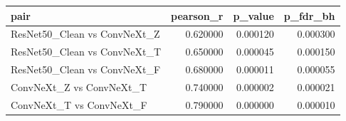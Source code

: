 \begin{tabular}{lrrr}
\toprule
pair & pearson_r & p_value & p_fdr_bh \\
\midrule
ResNet50_Clean vs ConvNeXt_Z & 0.620000 & 0.000120 & 0.000300 \\
ResNet50_Clean vs ConvNeXt_T & 0.650000 & 0.000045 & 0.000150 \\
ResNet50_Clean vs ConvNeXt_F & 0.680000 & 0.000011 & 0.000055 \\
ConvNeXt_Z vs ConvNeXt_T & 0.740000 & 0.000002 & 0.000021 \\
ConvNeXt_T vs ConvNeXt_F & 0.790000 & 0.000000 & 0.000010 \\
\bottomrule
\end{tabular}
